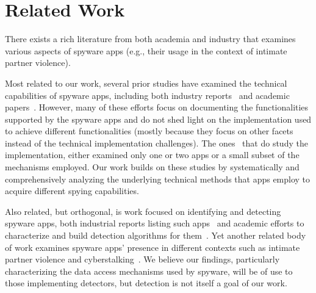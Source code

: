
\section{Related Work}
\label{sec:related_work}
There exists a rich literature from both academia and industry that
examines various aspects of spyware apps (e.g., their usage in the
context of intimate partner violence).

Most related to our work, several prior studies have examined
the technical capabilities of spyware apps, including
both industry reports~\cite{PowerPoi79:online, SpyvsSpy59:online,
  ANewWave1:online, Whyyoush17:online, ReverseE12:online,
  YourInfo19:online, Stalking85:online, FlexSpyA1:online,
  diskurse89:online, VB2019Za6:online, SpywareP46:online, Androida91:online} and academic
papers~\cite{parsons2019predator, harkin2019consumer,
  harkin2020commodification, pierazzi2020data,
  feal2020angel,harkin2021operating}. However, many of these
efforts focus on documenting the functionalities supported by the
spyware apps and do not shed light on the implementation used to achieve
different functionalities (mostly because they focus on other facets instead
of the technical implementation challenges). The ones~\cite{Whyyoush17:online,ReverseE12:online,Stalking85:online,FlexSpyA1:online,diskurse89:online,VB2019Za6:online,parsons2019predator} that do study the implementation,
either examined only one or two apps or a small subset of the
mechanisms employed. Our work builds on these studies by systematically and comprehensively analyzing the underlying technical methods that apps employ to acquire different spying capabilities.

Also related, but orthogonal, is work focused on identifying and
detecting spyware apps, both industrial reports listing such
apps~\cite{Tekstalk86:online, esetandr4:online, ch33r10S37:online} and
academic efforts to characterize and build detection algorithms for
them~\cite{almansoori2022global,pierazzi2020data, chatterjee2018spyware, han2021towards,
  saroiu2004measurement, egele2007dynamic, roundy2020many,
  wang2006netspy, moshchuk2006crawler, randall2020trufflehunter}.  Yet
another related body of work examines spyware apps' presence in
different contexts such as intimate partner violence and
cyberstalking~\cite{havron2019clinical,freed2019my,tseng2020tools,thomas2021sok,freed2018stalker,fraser2010new,
  shimizu2013domestic,woodlock2017abuse,southworth2005high,southworth2006technology,dragiewicz2019domestic,mayrhofer2021android,motherboardstalkerwaremarket}.
We believe our findings, particularly characterizing the data access
mechanisms used by spyware, will be of use to those implementing
detectors, but detection is not itself a goal of our work.


